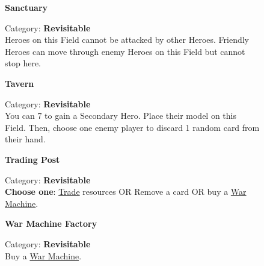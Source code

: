 \begin{figure}[H]
  \begin{minipage}[t]{0.47\textwidth}
    \vspace{0pt}
    \centering
    \textbf{Sanctuary}\par
    \caption{\small Category: \textbf{Revisitable}\\
      Heroes on this Field cannot be attacked by other Heroes.
      Friendly Heroes can move through enemy Heroes on this Field but cannot stop here.}
  \end{minipage}\hfill
  \begin{minipage}[t]{0.47\textwidth}
    \vspace{0pt}
    \centering
    \phantom{j}\textbf{Tavern}\par
    \caption{\small Category: \textbf{Revisitable}\\
      You can 
      7 
      to gain a Secondary Hero.
      Place their model on this Field.
      Then, choose one enemy player to discard 1 random card from their hand.}
  \end{minipage}
\end{figure}

\begin{figure}[H]
  \begin{minipage}[t]{0.47\textwidth}
    \vspace{0pt}
    \centering
    \hypertarget{Trading Post}{\textbf{Trading Post}}\par
    \caption{\small Category: \textbf{Revisitable}\\
      \textbf{Choose one}: \protect\hyperlink{Trading}{Trade} resources OR Remove a card OR buy a \protect\hyperlink{War Machines}{War Machine}.
    }
  \end{minipage}\hfill
  \begin{minipage}[t]{0.47\textwidth}
    \vspace{0pt}
    \centering
    \phantom{j}\hypertarget{War Machine Factory}{\textbf{War Machine Factory}}\par
    \caption{\small Category: \textbf{Revisitable}\\Buy a \protect\hyperlink{War Machines}{War Machine}.\phantom{.......}}
  \end{minipage}
\end{figure}

